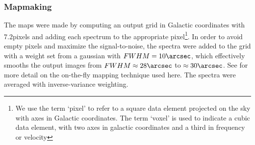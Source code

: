% 
% 


\subsubsection{Mapmaking}
The maps were made by computing an output grid in Galactic coordinates with
7.2\arcsec pixels and adding each spectrum to the appropriate pixel\footnote{We
use the term `pixel' to refer to a square data element projected on the sky
with axes in Galactic coordinates.  The term `voxel' is used to indicate a cubic data
element, with two axes in galactic coordinates and a third in frequency or
velocity}.  In order
to avoid empty pixels and maximize the signal-to-noise, the spectra were added
to the grid with a weight set from a gaussian with $FWHM=10\arcsec$, which
effectively smooths the output images from $FWHM\approx28\arcsec$ to
$\approx30\arcsec$.  See \citet{Mangum2007a} for more detail on the on-the-fly
mapping technique used here.  The spectra were averaged with inverse-variance
weighting.


